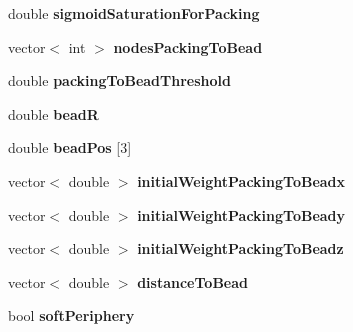 \begin{DoxyCompactItemize}
\item 
\hypertarget{classSimulation_a518ef4319a889b505ff0047fc30a1665}{}double {\bfseries sigmoid\+Saturation\+For\+Packing}\label{classSimulation_a518ef4319a889b505ff0047fc30a1665}

\item 
\hypertarget{classSimulation_a5a7884c8d7cdf5c13a9626a6a5eee14c}{}vector$<$ int $>$ {\bfseries nodes\+Packing\+To\+Bead}\label{classSimulation_a5a7884c8d7cdf5c13a9626a6a5eee14c}

\item 
\hypertarget{classSimulation_a726222dd169135b1fac85ebedba4514f}{}double {\bfseries packing\+To\+Bead\+Threshold}\label{classSimulation_a726222dd169135b1fac85ebedba4514f}

\item 
\hypertarget{classSimulation_a1b1797ba2b1c3bfa42d2926edd5875c4}{}double {\bfseries bead\+R}\label{classSimulation_a1b1797ba2b1c3bfa42d2926edd5875c4}

\item 
\hypertarget{classSimulation_a86bfe6bad81d944df7e2eb34f12a32cf}{}double {\bfseries bead\+Pos} \mbox{[}3\mbox{]}\label{classSimulation_a86bfe6bad81d944df7e2eb34f12a32cf}

\item 
\hypertarget{classSimulation_a9bad5c7c993bde91db5bff7e16d5b4ae}{}vector$<$ double $>$ {\bfseries initial\+Weight\+Packing\+To\+Beadx}\label{classSimulation_a9bad5c7c993bde91db5bff7e16d5b4ae}

\item 
\hypertarget{classSimulation_a675ef253268ab038b0d7911d9dbba6bf}{}vector$<$ double $>$ {\bfseries initial\+Weight\+Packing\+To\+Beady}\label{classSimulation_a675ef253268ab038b0d7911d9dbba6bf}

\item 
\hypertarget{classSimulation_a519b602c408e59d4d21bf79f64ef0b32}{}vector$<$ double $>$ {\bfseries initial\+Weight\+Packing\+To\+Beadz}\label{classSimulation_a519b602c408e59d4d21bf79f64ef0b32}

\item 
\hypertarget{classSimulation_a049f26aa993daa0d17334bc16b1e4bd0}{}vector$<$ double $>$ {\bfseries distance\+To\+Bead}\label{classSimulation_a049f26aa993daa0d17334bc16b1e4bd0}

\item 
\hypertarget{classSimulation_af0e6096603f734ee31fbd898f94bf38b}{}bool {\bfseries soft\+Periphery}\label{classSimulation_af0e6096603f734ee31fbd898f94bf38b}


\end{DoxyCompactItemize}

